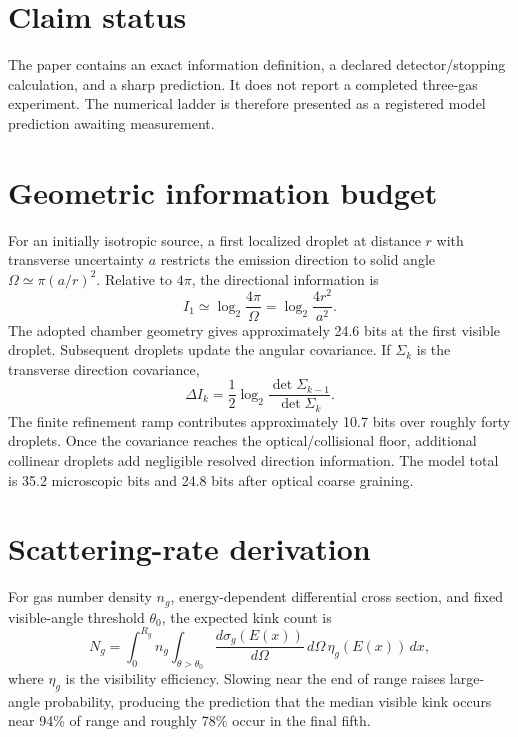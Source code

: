 \documentclass[11pt,a4paper]{article}
\begin{document}
\section{Claim status}
The paper contains an exact information definition, a declared detector/stopping calculation, and a sharp prediction. It does not report a completed three-gas experiment. The numerical ladder is therefore presented as a registered model prediction awaiting measurement.


\section{Geometric information budget}
For an initially isotropic source, a first localized droplet at distance $r$ with transverse uncertainty $a$ restricts the emission direction to solid angle $\Omega\simeq\pi(a/r)^2$. Relative to $4\pi$, the directional information is
\begin{equation}
I_1\simeq\log_2\frac{4\pi}{\Omega}
=\log_2\frac{4r^2}{a^2}.
\end{equation}
The adopted chamber geometry gives approximately 24.6 bits at the first visible droplet. Subsequent droplets update the angular covariance. If $\Sigma_k$ is the transverse direction covariance,
\begin{equation}
\Delta I_k=\frac12\log_2\frac{\det\Sigma_{k-1}}{\det\Sigma_k}.
\end{equation}
The finite refinement ramp contributes approximately 10.7 bits over roughly forty droplets. Once the covariance reaches the optical/collisional floor, additional collinear droplets add negligible resolved direction information. The model total is 35.2 microscopic bits and 24.8 bits after optical coarse graining.

\section{Scattering-rate derivation}
For gas number density $n_g$, energy-dependent differential cross section, and fixed visible-angle threshold $\theta_0$, the expected kink count is
\begin{equation}
N_g=\int_0^{R_g}n_g
\int_{\theta>\theta_0}\frac{d\sigma_g(E(x))}{d\Omega}\,d\Omega\,
\eta_g(E(x))\,dx,
\end{equation}
where $\eta_g$ is the visibility efficiency. Slowing near the end of range raises large-angle probability, producing the prediction that the median visible kink occurs near 94\% of range and roughly 78\% occur in the final fifth.
\end{document}
